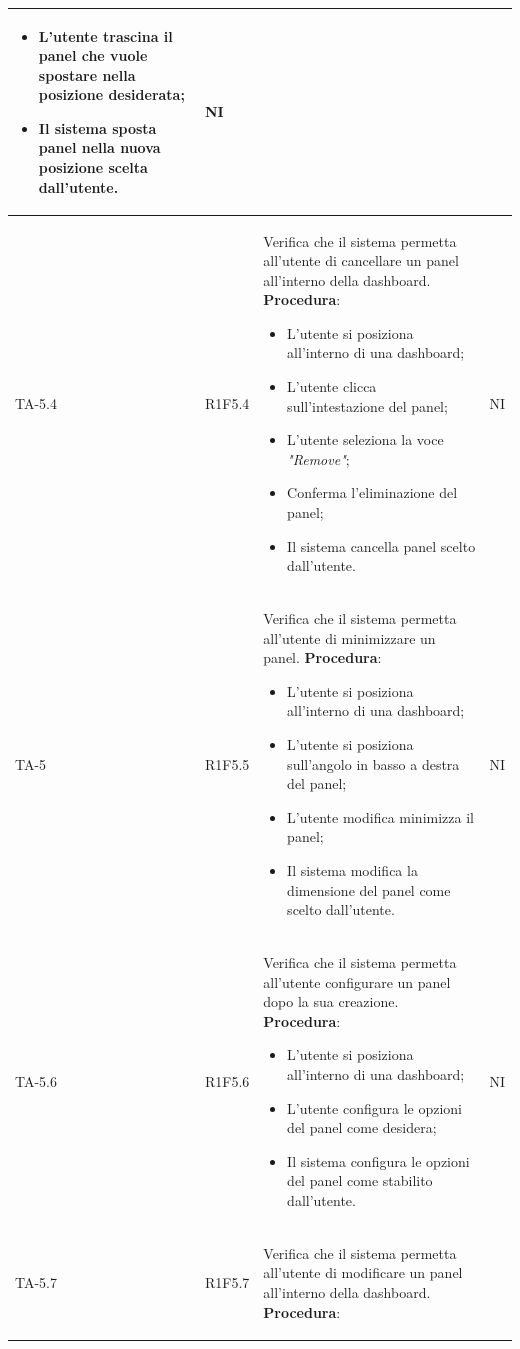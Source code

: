 \begin{longtable}{|C{2.5cm}|C{2.5cm}|L{6.5cm}|C{1.5cm}|}
\begin{itemize}
		\item L'utente trascina il panel che vuole spostare nella posizione desiderata;
		\item Il sistema sposta panel nella nuova posizione scelta dall'utente.
	\end{itemize}
	 & {NI}\\
	\hline
	{TA-5.4} & {R1F5.4} & 
	Verifica che il sistema permetta all'utente di cancellare un panel all'interno della dashboard.
	\textbf{Procedura}:
	\begin{itemize}		
		\item L'utente si posiziona all'interno di una dashboard;
		\item L'utente clicca sull'intestazione del panel;
		\item L'utente seleziona la voce \emph{"Remove"};
		\item Conferma l'eliminazione del panel;
		\item Il sistema cancella panel scelto dall'utente.
	\end{itemize}
	 & {NI}\\
	\hline
	{TA-5} & {R1F5.5} & 
	Verifica che il sistema permetta all'utente di minimizzare un panel.
	\textbf{Procedura}:
	\begin{itemize}		
		\item L'utente si posiziona all'interno di una dashboard;
		\item L'utente si posiziona sull'angolo in basso a destra del panel;
		\item L'utente modifica minimizza il panel;
		\item Il sistema modifica la dimensione del panel come scelto dall'utente.
	\end{itemize}
	 & {NI}\\
	\hline
	{TA-5.6} & {R1F5.6} & 
	Verifica che il sistema permetta all'utente configurare un panel dopo la sua creazione.
	\textbf{Procedura}:
	\begin{itemize}		
		\item L'utente si posiziona all'interno di una dashboard;
		\item L'utente configura le opzioni del panel come desidera;
		\item Il sistema configura le opzioni del panel come stabilito dall'utente.
	\end{itemize}
	 & {NI}\\
	\hline
	{TA-5.7} & {R1F5.7} & 
	Verifica che il sistema permetta all'utente di modificare un panel all'interno della dashboard.
	\textbf{Procedura}:
	\begin{itemize}		

\end{itemize}
\end{longtable}

